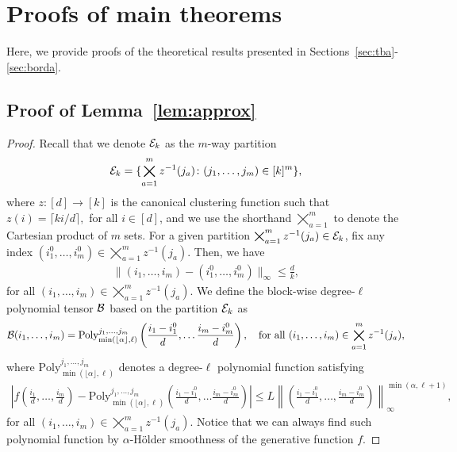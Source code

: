\documentclass[11pt]{article}
\theoremstyle{definition}
\begin{document}
\section{Proofs of main theorems}\label{app:theorem}

Here, we provide proofs of the theoretical results presented in Sections~\ref{sec:tba}-\ref{sec:borda}. 

\subsection{Proof of Lemma~\ref{lem:approx}}
\begin{proof}
Recall that we denote $\mathcal{E}_k$ as the $m$-way partition
\begin{align}
    \mathcal{E}_k = \{\bigtimes_{a=1}^m z^{-1}(j_a)\colon (j_1,\ldots,j_m)\in [k]^m\}, 
\end{align}
where $z\colon [d]\rightarrow[k]$ is the canonical clustering function such that $z(i) = \lceil ki/d\rceil,$ for all $i \in[d]$, and we use the shorthand $\bigtimes_{a=1}^m$ to denote the Cartesian product of $m$ sets. For a given partition  $ \bigtimes_{a=1}^m z^{-1}(j_a)\in\mathcal{E}_k$, fix any index  $(i_1^0,\ldots,i_m^0)\in \bigtimes_{a=1}^m z^{-1}(j_a)$. Then, we have 
\begin{align}\label{eq:ind}
\|(i_1,\ldots,i_m)-(i_1^0,\ldots,i_m^0)\|_\infty \leq \frac{d}{k},
\end{align} 
for all $(i_1,\ldots,i_m)\in \bigtimes_{a=1}^m z^{-1}(j_a)$.
We define the block-wise degree-$\ell$ polynomial tensor $\mathcal{B}$ based on the partition $\mathcal{E}_k$ as
\begin{align}
    \mathcal{B}(i_1,\ldots,i_m) = \text{Poly}^{j_1,\ldots,j_m}_{\min(\lfloor \alpha \rfloor,\ell)}\left(\frac{i_1-i_1^0}{d},\ldots\frac{i_m-i_m^0}{d}\right), \quad \text{for all } (i_1,\ldots,i_m)\in \bigtimes_{a=1}^m z^{-1}(j_a),
\end{align}
where $\text{Poly}^{j_1,\ldots,j_m}_{\min(\lfloor \alpha \rfloor,\ell)}$ denotes a degree-$\ell$ polynomial function satisfying
\begin{align}\label{eq:polyapp}
\left|f\left(\frac{i_1}{d},\ldots,\frac{i_m}{d}\right)-\text{Poly}^{j_1,\ldots,j_m}_{\min(\lfloor \alpha \rfloor,\ell)}\left(\frac{i_1-i_1^0}{d},\ldots\frac{i_m-i_m^0}{d}\right)\right|\leq L\left\|\left(\frac{i_1-i_1^0}{d},\ldots,\frac{i_m-i_m^0}{d}\right)\right\|_\infty^{\min(\alpha,\ell+1)},
\end{align}
for all $(i_1,\ldots,i_m)\in \bigtimes_{a=1}^m z^{-1}(j_a).$
Notice that we can always find such polynomial function by $\alpha$-H\"older smoothness of the generative function $f$.

\end{proof}
\end{document}
